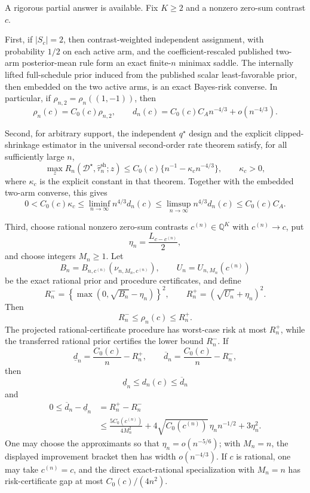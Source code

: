 A rigorous partial answer is available.  Fix \(K\geq2\) and a nonzero zero-sum contrast \(c\).

First, if \(|S_c|=2\), then contrast-weighted independent assignment, with probability \(1/2\) on each active arm, and the coefficient-rescaled published two-arm posterior-mean rule form an exact finite-\(n\) minimax saddle.  The internally lifted full-schedule prior induced from the published scalar least-favorable prior, then embedded on the two active arms, is an exact Bayes-risk converse.  In particular, if \(\rho_{n,2}=\rho_n((1,-1))\), then
\[
 \rho_n(c)=C_0(c)\rho_{n,2},
 \qquad
 d_n(c)=C_0(c)C_A n^{-4/3}+o(n^{-4/3}).
\]

Second, for arbitrary support, the independent \(q^\star\) design and the explicit clipped-shrinkage estimator in the universal second-order rate theorem satisfy, for all sufficiently large \(n\),
\[
 \max_z R_n(\mathcal D^\star,\widehat\tau_n^{\mathrm{sh}};z)
 \leq C_0(c)\{n^{-1}-\kappa_c n^{-4/3}\},
 \qquad \kappa_c>0,
\]
where \(\kappa_c\) is the explicit constant in that theorem.  Together with the embedded two-arm converse, this gives
\[
 0<C_0(c)\kappa_c
 \leq\liminf_{n\to\infty}n^{4/3}d_n(c)
 \leq\limsup_{n\to\infty}n^{4/3}d_n(c)
 \leq C_0(c)C_A.
\]

Third, choose rational nonzero zero-sum contrasts \(c^{(n)}\in\mathbb Q^K\) with \(c^{(n)}\to c\), put
\[
 \eta_n=\frac{L_{c-c^{(n)}}}{2},
\]
and choose integers \(M_n\geq1\).  Let
\[
 B_n=B_{n,c^{(n)}}(\nu_{n,M_n,c^{(n)}}),
 \qquad
 U_n=U_{n,M_n}(c^{(n)})
\]
be the exact rational prior and procedure certificates, and define
\[
 R_n^-=\left\{\max(0,\sqrt{B_n}-\eta_n)\right\}^2,
 \qquad
 R_n^+=(\sqrt{U_n}+\eta_n)^2.
\]
Then
\[
 R_n^-\leq\rho_n(c)\leq R_n^+.
\]
The projected rational-certificate procedure has worst-case risk at most \(R_n^+\), while the transferred rational prior certifies the lower bound \(R_n^-\).  If
\[
 \underline d_n=\frac{C_0(c)}n-R_n^+,
 \qquad
 \overline d_n=\frac{C_0(c)}n-R_n^-,
\]
then
\[
 \underline d_n\leq d_n(c)\leq\overline d_n
\]
and
\[
 \begin{aligned}
 0\leq\overline d_n-\underline d_n
 &=R_n^+-R_n^-\\
 &\leq\frac{5C_0(c^{(n)})}{4M_n^2}
 +4\sqrt{C_0(c^{(n)})}\,\eta_n n^{-1/2}
 +3\eta_n^2.
 \end{aligned}
\]
One may choose the approximants so that \(\eta_n=o(n^{-5/6})\); with \(M_n=n\), the displayed improvement bracket then has width \(o(n^{-4/3})\).  If \(c\) is rational, one may take \(c^{(n)}=c\), and the direct exact-rational specialization with \(M_n=n\) has risk-certificate gap at most \(C_0(c)/(4n^2)\).


